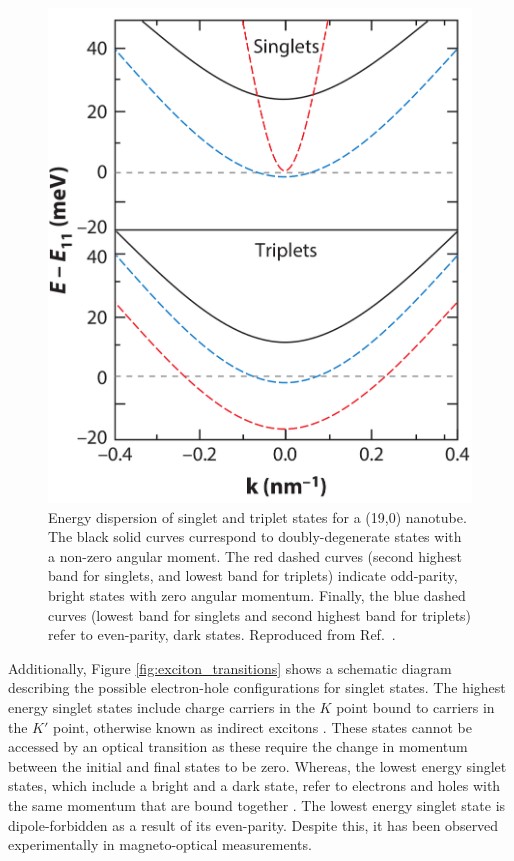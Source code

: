 \begin{figure}[ht]
	\centering
	\includegraphics[scale=0.25]{images/chapter_optical_props/dark_and_bright_excitons}
	\caption{Energy dispersion of singlet and triplet states for a (19,0) nanotube. The black solid curves currespond to doubly-degenerate states with a non-zero angular moment. The red dashed curves (second highest band for singlets, and lowest band for triplets) indicate odd-parity, bright states with zero angular momentum. Finally, the blue dashed curves (lowest band for singlets and second highest band for triplets) refer to even-parity, dark states. Reproduced from Ref.\ \cite{amori2018excitons}.}
	\label{fig:dark_bright_excitons_dispersion}
\end{figure}

Additionally, Figure \ref{fig:exciton_transitions} shows a schematic diagram describing the possible electron-hole configurations for singlet states. The highest energy singlet states include charge carriers in the $K$ point bound to carriers in the $K'$ point, otherwise known as indirect excitons \cite{srivastava2008direct}. These states cannot be accessed by an optical transition as these require the change in momentum between the initial and final states to be zero.  Whereas, the lowest energy singlet states, which include a bright and a dark state, refer to electrons and holes with the same momentum that are bound together \cite{srivastava2008direct}. The lowest energy singlet state is dipole-forbidden as a result of its even-parity. Despite this, it has been observed experimentally in magneto-optical measurements.

